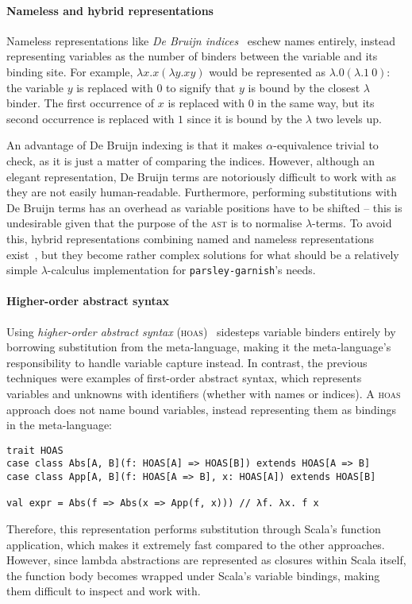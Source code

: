 \documentclass[../../../main.tex]{subfiles}
\begin{document}
\paragraph{Nameless and hybrid representations}
Nameless representations like \emph{De Bruijn indices}~\cite{debruijn_lambda_1972} eschew names entirely, instead representing variables as the number of binders between the variable and its binding site.
For example, $\lambda x. x(\lambda y. x y)$ would be represented as $\lambda. 0(\lambda. 1\ 0)$: the variable $y$ is replaced with $0$ to signify that $y$ is bound by the closest $\lambda$ binder.
The first occurrence of $x$ is replaced with $0$ in the same way, but its second occurrence is replaced with $1$ since it is bound by the $\lambda$ two levels up.

An advantage of De Bruijn indexing is that it makes $\alpha$-equivalence trivial to check, as it is just a matter of comparing the indices.
However, although an elegant representation, De Bruijn terms are notoriously difficult to work with as they are not easily human-readable.
Furthermore, performing substitutions with De Bruijn terms has an overhead as variable positions have to be shifted -- this is undesirable given that the purpose of the \textsc{ast} is to normalise $\lambda$-terms.
To avoid this, hybrid representations combining named and nameless representations exist~\cite{mcbride_imnotanumber_2004,chargueraud_locally_2012}, but they become rather complex solutions for what should be a relatively simple $\lambda$-calculus implementation for \texttt{parsley-garnish}'s needs.

\paragraph{Higher-order abstract syntax}
Using \emph{higher-order abstract syntax} (\textsc{hoas})~\cite{pfenning_hoas_1988} sidesteps variable binders entirely by borrowing substitution from the meta-language, making it the meta-language's responsibility to handle variable capture instead.
In contrast, the previous techniques were examples of first-order abstract syntax, which represents variables and unknowns with identifiers (whether with names or indices).
A \textsc{hoas} approach does not name bound variables, instead representing them as bindings in the meta-language:

\begin{verbatim}
trait HOAS
case class Abs[A, B](f: HOAS[A] => HOAS[B]) extends HOAS[A => B]
case class App[A, B](f: HOAS[A => B], x: HOAS[A]) extends HOAS[B]

val expr = Abs(f => Abs(x => App(f, x))) // λf. λx. f x
\end{verbatim}
%
Therefore, this representation performs substitution through Scala's function application, which makes it extremely fast compared to the other approaches.
However, since lambda abstractions are represented as closures within Scala itself, the function body becomes wrapped under Scala's variable bindings, making them difficult to inspect and work with.
\end{document}
